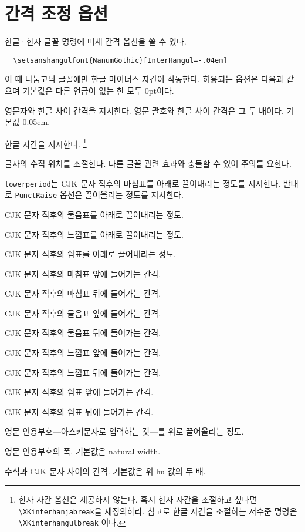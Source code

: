 \documentclass[a4paper]{article}
\def\cs#1{\texttt{\textbackslash #1}}
\def\hparens#1{\leavevmode\unskip---{\small #1}---\ignorespaces}
\begin{document}
\section{간격 조정 옵션}\label{sec:fontopts}
 한글·한자 글꼴 명령에 미세 간격 옵션을
쓸 수 있다.
\begin{verbatim}
  \setsanshangulfont{NanumGothic}[InterHangul=-.04em]
\end{verbatim}
이 때 나눔고딕 글꼴에만 한글 마이너스 자간이 작동한다.
허용되는 옵션은 다음과 같으며 기본값은 다른 언급이 없는 한 모두 0pt이다.
\begin{description}\itemsep0pt
\item[hu, InterLatinCJK]
  영문자와 한글 사이 간격을 지시한다.
  영문 괄호와 한글 사이 간격은 그 두 배이다. 기본값 0.05em.
\item[interhchar, InterHangul]
  { 한글 자간을} 지시한다.%
  \footnote{한자 자간 옵션은 제공하지 않는다.
  혹시 한자 자간을 조절하고 싶다면 \cs{XKinterhanjabreak}을 재정의하라.
  참고로 한글 자간을 조절하는 저수준 명령은 \cs{XKinterhangulbreak} 이다.}
\item[charraise, CharRaise]
  글자의 {수직 위치}를 조절한다.
  다른 글꼴 관련 효과와 충돌할 수 있어 주의를 요한다.
\item[lowerperiod, PunctRaise]
  \verb+lowerperiod+는 CJK 문자 직후의 마침표를 아래로 끌어내리는
  {정도를 지시한다.
  반대로 \verb+PunctRaise+ 옵션은 끌어올리는 정도를 지시한다.}
\item[lowerquestion]
  CJK 문자 직후의 물음표를 아래로 끌어내리는 정도.
\item[lowerexclamation]
  CJK 문자 직후의 느낌표를 아래로 끌어내리는 정도.
\item[lowercomma]
  CJK 문자 직후의 쉼표를 아래로 끌어내리는 정도.
\item[preperiodkern]
  {CJK 문자 직후의 마침표 앞에
  들어가는 간격.}
\item[postperiodkern]
  {CJK 문자 직후의 마침표 뒤에
  들어가는 간격.}
\item[prequestionkern]
  CJK 문자 직후의 물음표 앞에 들어가는 간격.
\item[postquestionkern]
  CJK 문자 직후의 물음표 뒤에 들어가는 간격.
\item[preexclamationkern]
  CJK 문자 직후의 느낌표 앞에 들어가는 간격.
\item[postexclamationkern]
  CJK 문자 직후의 느낌표 뒤에 들어가는 간격.
\item[precommakern]
  CJK 문자 직후의 쉼표 앞에 들어가는 간격.
\item[postcommakern]
  CJK 문자 직후의 쉼표 뒤에 들어가는 간격.
\item[quoteraise]
  영문 인용부호\hparens{아스키문자로 입력하는 것}를
  위로 끌어올리는 정도.
\item[quotewidth]
  영문 인용부호의 폭. 기본값은 natural width.
\item[postmathskip]
  수식과 CJK 문자 사이의 간격.  기본값은 위 hu 값의 두 배.
\end{description}
\end{document}

